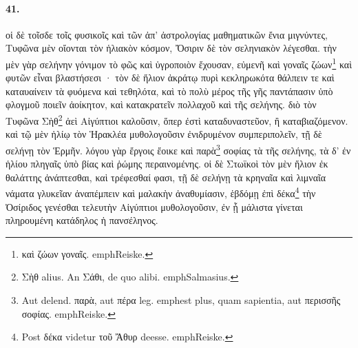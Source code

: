 \documentclass[a4paper, 11pt, oneside, polutonikogreek, german]{article}
\begin{document}
\paragraph{41.}
οἱ δὲ τοῖσδε τοῖς φυσικοῖς καὶ τῶν ἀπ' ἀστρολογίας μαθηματικῶν ἔνια μιγνύντες, Τυφῶνα μὲν οἴονται τὸν ἡλιακὸν κόσμον, Ὄσιριν δὲ τὸν σεληνιακὸν λέγεσθαι. τὴν μὲν γὰρ σελήνην γόνιμον τὸ φῶς καὶ ὑγροποιὸν ἔχουσαν, εὐμενῆ καὶ γοναῖς ζώων\footnote{καὶ ζώων γοναῖς. emph{Reiske.}} καὶ φυτῶν εἶναι βλαστήσεσι · τὸν δὲ ἥλιον ἀκράτῳ πυρὶ κεκληρωκότα θάλπειν τε καὶ καταυαίνειν τὰ φυόμενα καὶ τεθηλότα, καὶ τὸ πολὺ μέρος τῆς γῆς παντάπασιν ὑπὸ φλογμοῦ ποιεῖν ἀοίκητον, καὶ κατακρατεῖν πολλαχοῦ καὶ τῆς σελήνης. διὸ τὸν Τυφῶνα Σὴθ\footnote{Σὴθ alius. An Σάθι, de quo alibi. emph{Salmasius.}} ἀεὶ Αἰγύπτιοι καλοῦσιν, ὅπερ ἐστὶ καταδυναστεῦον, ἢ καταβιαζόμενον. καὶ τῷ μὲν ἡλίῳ τὸν Ἡρακλέα μυθολογοῦσιν ἐνιδρυμένον συμπεριπολεῖν, τῇ δὲ σελήνῃ τὸν Ἑρμῆν. λόγου γὰρ ἔργοις ἔοικε καὶ παρὰ\footnote{Aut delend. παρὰ, aut πέρα leg. emph{est plus, quam sapientia}, aut περισσῆς σοφίας. emph{Reiske.}} σοφίας τὰ τῆς σελήνης, τὰ δ' ἐν ἡλίου πληγαῖς ὑπὸ βίας καὶ ῥώμης περαινομένης. οἱ δὲ Στωϊκοὶ τὸν μὲν ἥλιον ἐκ θαλάττης ἀνάπτεσθαι, καὶ τρέφεσθαί φασι, τῇ δὲ σελήνῃ τὰ κρηναῖα καὶ λιμναῖα νάματα γλυκεῖαν ἀναπέμπειν καὶ μαλακὴν ἀναθυμίασιν, ἑβδόμῃ ἐπὶ δέκα\footnote{Post δέκα videtur τοῦ Ἄθυρ deesse. emph{Reiske.}} τὴν Ὀσίριδος γενέσθαι τελευτὴν Αἰγύπτιοι μυθολογοῦσιν, ἐν ᾗ μάλιστα γίνεται πληρουμένη κατάδηλος ἡ πανσέληνος.
\end{document}
